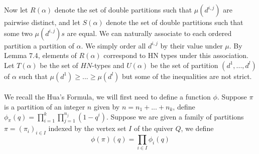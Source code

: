 \documentclass[12pt]{amsart}
\theoremstyle{plain}
\theoremstyle{definition}
\theoremstyle{remark}
\begin{document}
\hspace{-12pt}Now let $R(\alpha)$ denote the set of double partitions such that $\mu(d^{i,j})$ are pairwise distinct, and let $S(\alpha)$ denote the set of double partitions such that some two $\mu(d^{i,j})s$ are equal.
We can naturally associate to each ordered partition a partition of $\alpha$. We simply order all $d^{i,j}$ by their value under $\mu$. By Lemma 7.4, elements of $R(\alpha)$ correspond to HN types under this association. Let $T(\alpha)$ be the set of $HN$-types and $U(\alpha)$ be the set of partition $(d^1,...,d^l)$ of $\alpha$ such that $\mu(d^1)\geq...\geq \mu(d^l)$ but some of the inequalities are not strict.
\\~\\
We recall the Hua's Formula, we will first need to define a function $\phi$. Suppose $\pi$ is a partition of an integer $n$ given by $n=n_1+...+n_k$, define $\phi_{\pi}(q)=\prod_{i=1}^k\prod_{j=1}^{n_j}(1-q^i)$. Suppose we are given a family of partitions $\pi=(\pi_i)_{i\in I}$ indexed by the vertex set $I$ of the quiver $Q$, we define
$$\phi(\pi)(q)=\prod_{i\in I}\phi_i(q)$$
\end{document}
